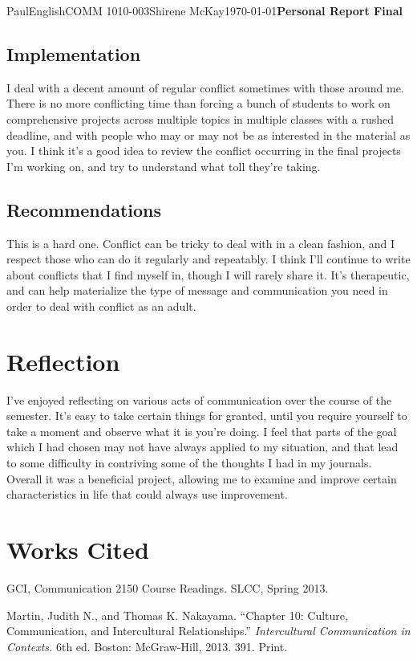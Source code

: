 \documentclass[12pt,letterpaper]{article}
\begin{document}
\begin{mla}{Paul}{English}{COMM 1010-003}{Shirene
    McKay}{\today}{\textbf{Personal Report Final}}
\subsection{Implementation}

I deal with a decent amount of regular conflict sometimes with those around me. There is no more conflicting time than forcing a bunch of students to work on comprehensive projects across multiple topics in multiple classes with a rushed deadline, and with people who may or may not be as interested in the material as you. I think it's a good idea to review the conflict occurring in the final projects I'm working on, and try to understand what toll they're taking.

\subsection{Recommendations}

This is a hard one. Conflict can be tricky to deal with in a clean fashion, and I respect those who can do it regularly and repeatably. I think I'll continue to write about conflicts that I find myself in, though I will rarely share it. It's therapeutic, and can help materialize the type of message and communication you need in order to deal with conflict as an adult.

\section{Reflection}

I've enjoyed reflecting on various acts of communication over the course of the semester. It's easy to take certain things for granted, until you require yourself to take a moment and observe what it is you're doing. I feel that parts of the goal which I had chosen may not have always applied to my situation, and that lead to some difficulty in contriving some of the thoughts I had in my journals. Overall it was a beneficial project, allowing me to examine and improve certain characteristics in life that could always use improvement.

\pagebreak
\section{Works Cited}

\bibent
GCI, Communication 2150 Course Readings. SLCC, Spring 2013.
\bibent

Martin, Judith N., and Thomas K. Nakayama. ``Chapter 10: Culture,
Communication, and Intercultural Relationships.''
\textit{Intercultural Communication in Contexts.} 6th ed. Boston: 
McGraw-Hill, 2013. 391. Print.


\end{mla}
\end{document}
